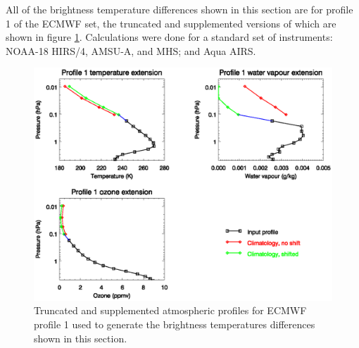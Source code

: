 All of the brightness temperature differences shown in this section are for profile 1 of the ECMWF set, the truncated and supplemented versions of which are shown in figure \ref{fig:blended_profile01}. Calculations were done for a standard set of instruments: NOAA-18 HIRS/4, AMSU-A, and MHS; and Aqua AIRS.
\begin{figure}[htp]
  \centering
  \includegraphics[scale=0.8]{graphics/ECMWF.blended_profile_01.eps}
  \caption{Truncated and supplemented atmospheric profiles for ECMWF profile 1 used to generate the brightness temperatures differences shown in this section.}
  \label{fig:blended_profile01}
\end{figure}


